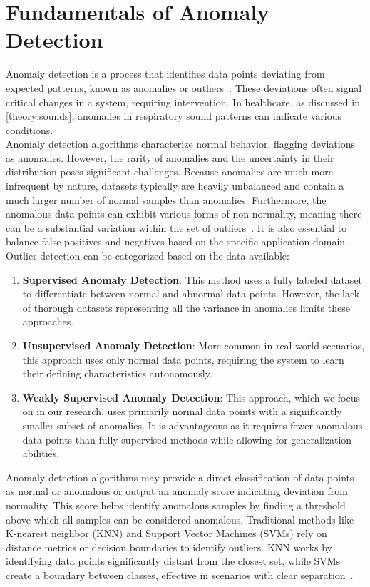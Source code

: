\section{Fundamentals of Anomaly Detection}
Anomaly detection is a process that identifies data points deviating from expected patterns, known as anomalies or outliers~\cite{chandola2009anomaly}. These deviations often signal critical changes in a system, requiring intervention. In healthcare, as discussed in \autoref{theory:sounds}, anomalies in respiratory sound patterns can indicate various conditions.\\
Anomaly detection algorithms characterize normal behavior, flagging deviations as anomalies. However, the rarity of anomalies and the uncertainty in their distribution poses significant challenges. Because anomalies are much more infrequent by nature, datasets typically are heavily unbalanced and contain a much larger number of normal samples than anomalies. Furthermore, the anomalous data points can exhibit various forms of non-normality, meaning there can be a substantial variation within the set of outliers~\cite{pang2021deep}. It is also essential to balance false positives and negatives based on the specific application domain.\\
Outlier detection can be categorized based on the data available:
\begin{enumerate}
  \item \textbf{Supervised Anomaly Detection}: This method uses a fully labeled dataset to differentiate between normal and abnormal data points. However, the lack of thorough datasets representing all the variance in anomalies limits these approaches.
  \item \textbf{Unsupervised Anomaly Detection}: More common in real-world scenarios, this approach uses only normal data points, requiring the system to learn their defining characteristics autonomously.
  \item \textbf{Weakly Supervised Anomaly Detection}: This approach, which we focus on in our research, uses primarily normal data points with a significantly smaller subset of anomalies. It is advantageous as it requires fewer anomalous data points than fully supervised methods while allowing for generalization abilities.
\end{enumerate}
Anomaly detection algorithms may provide a direct classification of data points as normal or anomalous or output an anomaly score indicating deviation from normality. This score helps identify anomalous samples by finding a threshold above which all samples can be considered anomalous. Traditional methods like K-nearest neighbor (KNN) and Support Vector Machines (SVMs) rely on distance metrics or decision boundaries to identify outliers. KNN works by identifying data points significantly distant from the closest set, while SVMs create a boundary between classes, effective in scenarios with clear separation~\cite{chandola2009anomaly}.\\
